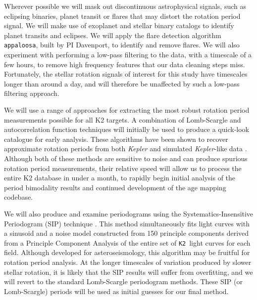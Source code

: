 \documentclass[12pt]{article}
\newcommand{\Kepler}{\textsl{Kepler}\xspace}
\newcommand{\ktwo}{{\tt K2}}
\begin{document}
Wherever possible we will mask out discontinuous astrophysical signals, such as
eclipsing binaries, planet transit or flares that may distort the rotation
period signal.
We will make use of exoplanet and stellar binary catalogs to identify planet transits
and eclipses.
We will apply the flare detection algorithm {\tt appaloosa}, built by PI
Davenport, to identify and remove flares.
We will also experiment with performing a low-pass filtering to the data, with a timescale of a few hours, to remove high frequency features that our data cleaning steps miss.
Fortunately, the stellar rotation signals of interest for this study
have timescales longer than around a day, and will therefore be unaffected by
such a low-pass filtering approach.

We will use a range of approaches for extracting the most robust rotation period measurements possible for all K2 targets. A combination of Lomb-Scargle and autocorrelation function
techniques will initially be used to produce a quick-look catalogue for early analysis. These algorithms have been shown to recover approximate rotation periods from both \Kepler and simulated \Kepler-like data \citep{aigrain2015}.
Although both of these methods are sensitive to noise and can produce spurious
rotation period measurements, their relative speed will allow us to process the entire K2 database in under a month, to rapidly begin initial analysis of the period bimodality results and continued development of the age mapping codebase.

We will also produce and examine periodograms using the
Systematics-Insensitive Periodogram (SIP) technique \citep{angus2015}.
This method simultaneously fits light curves with a sinusoid and a noise
model constructed from 150 principle components derived from a Principle Component Analysis of the entire set of \ktwo\ light curves for each field. 
Although developed for asteroseismology, this algorithm may be fruitful for rotation period analysis. At the longer timescales of variation produced by slower stellar rotation, it is likely that the SIP results will suffer from overfitting, and we will revert to the standard Lomb-Scargle periodogram methods. These SIP (or Lomb-Scargle) periods will be used as initial guesses for our final method.
\end{document}
